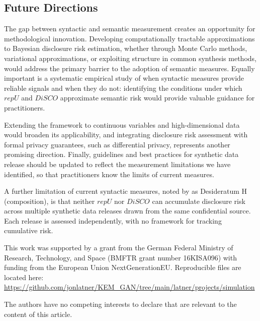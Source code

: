 \documentclass[Afour,sageh,times,doublespace]{sagej}
\begin{document}
\subsection{Future Directions}

The gap between syntactic and semantic measurement creates an opportunity for methodological innovation. Developing computationally tractable approximations to Bayesian disclosure risk estimation, whether through Monte Carlo methods, variational approximations, or exploiting structure in common synthesis methods, would address the primary barrier to the adoption of semantic measures. Equally important is a systematic empirical study of when syntactic measures provide reliable signals and when they do not: identifying the conditions under which $repU$ and $DiSCO$ approximate semantic risk would provide valuable guidance for practitioners.

Extending the framework to continuous variables and high-dimensional data would broaden its applicability, and integrating disclosure risk assessment with formal privacy guarantees, such as differential privacy, represents another promising direction. Finally, guidelines and best practices for synthetic data release should be updated to reflect the measurement limitations we have identified, so that practitioners know the limits of current measures.

A further limitation of current syntactic measures, noted by \citet{Jarmin2023} as Desideratum H (composition), is that neither $repU$ nor $DiSCO$ can accumulate disclosure risk across multiple synthetic data releases drawn from the same confidential source. Each release is assessed independently, with no framework for tracking cumulative risk. 



\begin{acks}
This work was supported by a grant from the German Federal Ministry of Research, Technology, and Space (BMFTR grant number 16KISA096) with funding from the European Union NextGenerationEU. Reproducible files are located here: \url{https://github.com/jonlatner/KEM_GAN/tree/main/latner/projects/simulation}
\end{acks}

\begin{dci}
The authors have no competing interests to declare that are relevant to the content of this article.
\end{dci}
\end{document}
